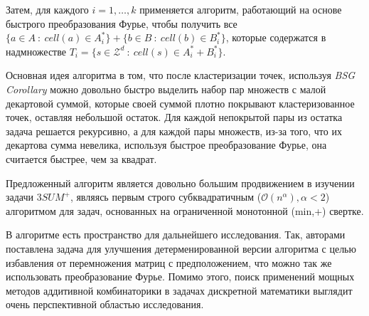 Затем, для каждого $i=1, \ldots, k$ применяется алгоритм, работающий на основе быстрого преобразования Фурье, чтобы получить все $\{a \in A\ :\ cell(a) \in A_i^*\}+\{b \in B\ :\ cell(b) \in B_i^*\}$, которые содержатся в надмножестве $T_i=\{s \in \mathcal{Z}^d\ :\ cell(s) \in A_i^* + B_i^*\}$.

Основная идея алгоритма в том, что после кластеризации точек, используя \textit{BSG Corollary} можно довольно быстро выделить набор пар множеств с малой декартовой суммой, которые своей суммой плотно покрывают кластеризованное точек, оставляя небольшой остаток. Для каждой непокрытой пары из остатка задача решается рекурсивно, а для каждой пары множеств, из-за того, что их декартова сумма невелика, используя быстрое преобразование Фурье, она считается быстрее, чем за квадрат.

Предложенный алгоритм является довольно большим продвижением в изучении задачи $3SUM^+$, являясь первым строго субквадратичным ($\mathcal{O}(n^\alpha), \alpha < 2$) алгоритмом для задач, основанных на ограниченной монотонной (min,+) свертке.

В алгоритме есть пространство для дальнейшего исследования. Так, авторами поставлена задача для улучшения детерменированной версии алгоритма с целью избавления от перемножения матриц с предположением, что можно так же использовать преобразование Фурье. Помимо этого, поиск применений мощных методов аддитивной комбинаторики в задачах дискретной математики выглядит очень перспективной областью исследования.
